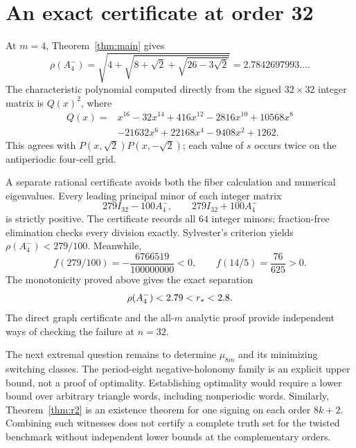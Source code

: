 \section{An exact certificate at order 32}

At $m=4$, Theorem~\ref{thm:main} gives
\begin{equation}
 \rho(A_4^-)
 =\sqrt{4+\sqrt{8+\sqrt2+\sqrt{26-3\sqrt2}}}
 =2.7842697993\ldots.
 \label{eq:n32}
\end{equation}
The characteristic polynomial computed directly from the signed
$32\times32$ integer matrix is $Q(x)^2$, where
\begin{align*}
 Q(x)={}&x^{16}-32x^{14}+416x^{12}-2816x^{10}+10568x^8\\
       &-21632x^6+22168x^4-9408x^2+1262.
\end{align*}
This agrees with $P(x,\sqrt2)P(x,-\sqrt2)$; each value of $s$ occurs twice
on the antiperiodic four-cell grid.

A separate rational certificate avoids both the fiber calculation and
numerical eigenvalues. Every leading principal minor of each integer matrix
\[
 279I_{32}-100A_4^-,\qquad 279I_{32}+100A_4^-
\]
is strictly positive. The certificate records all $64$ integer minors;
fraction-free elimination checks every division exactly. Sylvester's
criterion yields $\rho(A_4^-)<279/100$. Meanwhile,
\[
 f(279/100)=-\frac{6766519}{100000000}<0,
 \qquad f(14/5)=\frac{76}{625}>0.
\]
The monotonicity proved above gives the exact separation
\[
 \rho(A_4^-)<2.79<r_*<2.8.
\]
The direct graph certificate and the all-$m$ analytic proof provide
independent ways of checking the failure at $n=32$.

The next extremal question remains to determine $\mu_{8m}$ and its
minimizing switching classes. The period-eight negative-holonomy family is
an explicit upper bound, not a proof of optimality. Establishing optimality
would require a lower bound over arbitrary triangle words, including
nonperiodic words. Similarly, Theorem~\ref{thm:r2} is an existence theorem
for one signing on each order $8k+2$. Combining such witnesses does not
certify a complete truth set for the twisted benchmark without independent
lower bounds at the complementary orders.
